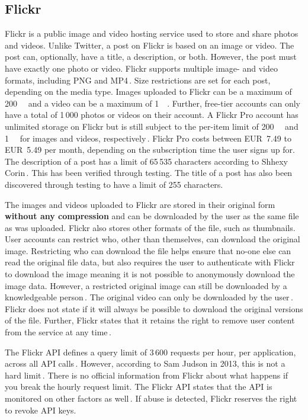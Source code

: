 \subsection{Flickr}
\label{subsec:ows_flickr}
Flickr is a public image and video hosting service used to store and share photos and videos. Unlike Twitter, a post on Flickr is based on an image or video. The post can, optionally, have a title, a description, or both. However, the post must have exactly one photo or video. Flickr supports multiple image- and video formats, including PNG and MP4\,\cite{FlickrUploadRequirements2022}. Size restrictions are set for each post, depending on the media type. Images uploaded to Flickr can be a maximum of \SI{200}{\mega\byte} and a video can be a maximum of \SI{1}{\giga\byte}. Further, \mbox{free-tier} accounts can only have a total of 1\,000 photos or videos on their account. A Flickr Pro account has unlimited storage on Flickr but is still subject to the \mbox{per-item} limit of \SI{200}{\mega\byte} and \SI{1}{\giga\byte} for images and videos, respectively\,\cite{flickrinc.UpgradeEverythingYou}. Flickr Pro costs between EUR~7.49 to EUR~5.49 per month, depending on the subscription time the user signs up for. The description of a post has a limit of 65\,535 characters according to Shhexy Corin\,\cite{FlickrHelpForum2009}. This has been verified through testing. The title of a post has also been discovered through testing to have a limit of 255 characters.

The images and videos uploaded to Flickr are stored in their original form \textbf{without any compression} and can be downloaded by the user as the same file as was uploaded\cite{flickrinc.DownloadPermissions}. Flickr also stores other formats of the file, such as thumbnails. User accounts can restrict who, other than themselves, can download the original image. Restricting who can download the file helps ensure that \mbox{no-one} else can read the original file data, but also requires the user to authenticate with Flickr to download the image meaning it is not possible to anonymously download the image data. However, a restricted original image can still be downloaded by a knowledgeable person\,\cite{FlickrHelpForum2020}. The original video can only be downloaded by the user\,\cite{flickrinc.DownloadPermissions}. Flickr does not state if it will always be possible to download the original versions of the file. Further, Flickr states that it retains the right to remove user content from the service at any time\,\cite{flickrinc.FlickrTermsConditions2020}.

The Flickr \gls{API} defines a query limit of 3\,600 requests per hour, per application, across all \gls{API} calls\,\cite{flickrinc.FlickrFlickrDeveloper}. However, according to Sam Judson in 2013, this is not a hard limit\,\cite{WhatAreAPI2013}. There is no official information from Flickr about what happens if you break the hourly request limit. The Flickr \gls{API} states that the \gls{API} is monitored on other factors as well\,\cite{flickrinc.FlickrFlickrDeveloper}. If abuse is detected, Flickr reserves the right to revoke \gls{API} keys.